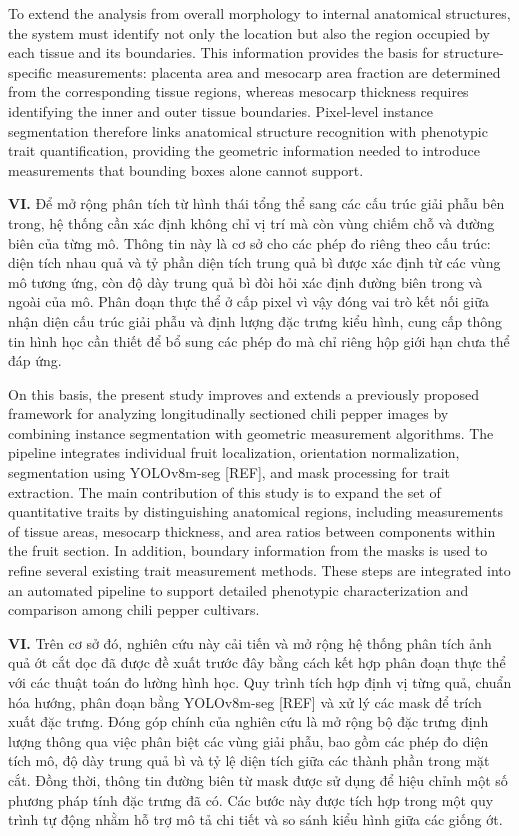 \documentclass[final,1p,11pt,longtitle]{elsarticle}
\newenvironment{viet}{\par\smallskip\begingroup\color{viColor}\noindent\textbf{VI. }\ignorespaces}{\par\endgroup\smallskip}
\begin{document}
To extend the analysis from overall morphology to internal anatomical structures, the system must identify not only the location but also the region occupied by each tissue and its boundaries. This information provides the basis for structure-specific measurements: placenta area and mesocarp area fraction are determined from the corresponding tissue regions, whereas mesocarp thickness requires identifying the inner and outer tissue boundaries. Pixel-level instance segmentation therefore links anatomical structure recognition with phenotypic trait quantification, providing the geometric information needed to introduce measurements that bounding boxes alone cannot support.

\begin{viet}
Để mở rộng phân tích từ hình thái tổng thể sang các cấu trúc giải phẫu bên trong, hệ thống cần xác định không chỉ vị trí mà còn vùng chiếm chỗ và đường biên của từng mô. Thông tin này là cơ sở cho các phép đo riêng theo cấu trúc: diện tích nhau quả và tỷ phần diện tích trung quả bì được xác định từ các vùng mô tương ứng, còn độ dày trung quả bì đòi hỏi xác định đường biên trong và ngoài của mô. Phân đoạn thực thể ở cấp pixel vì vậy đóng vai trò kết nối giữa nhận diện cấu trúc giải phẫu và định lượng đặc trưng kiểu hình, cung cấp thông tin hình học cần thiết để bổ sung các phép đo mà chỉ riêng hộp giới hạn chưa thể đáp ứng.
\end{viet}


On this basis, the present study improves and extends a previously proposed framework for analyzing longitudinally sectioned chili pepper images by combining instance segmentation with geometric measurement algorithms. The pipeline integrates individual fruit localization, orientation normalization, segmentation using YOLOv8m-seg [REF], and mask processing for trait extraction. The main contribution of this study is to expand the set of quantitative traits by distinguishing anatomical regions, including measurements of tissue areas, mesocarp thickness, and area ratios between components within the fruit section. In addition, boundary information from the masks is used to refine several existing trait measurement methods. These steps are integrated into an automated pipeline to support detailed phenotypic characterization and comparison among chili pepper cultivars.

\begin{viet}
Trên cơ sở đó, nghiên cứu này cải tiến và mở rộng hệ thống phân tích ảnh quả ớt cắt dọc đã được đề xuất trước đây bằng cách kết hợp phân đoạn thực thể với các thuật toán đo lường hình học. Quy trình tích hợp định vị từng quả, chuẩn hóa hướng, phân đoạn bằng YOLOv8m-seg [REF] và xử lý các mask để trích xuất đặc trưng. Đóng góp chính của nghiên cứu là mở rộng bộ đặc trưng định lượng thông qua việc phân biệt các vùng giải phẫu, bao gồm các phép đo diện tích mô, độ dày trung quả bì và tỷ lệ diện tích giữa các thành phần trong mặt cắt. Đồng thời, thông tin đường biên từ mask được sử dụng để hiệu chỉnh một số phương pháp tính đặc trưng đã có. Các bước này được tích hợp trong một quy trình tự động nhằm hỗ trợ mô tả chi tiết và so sánh kiểu hình giữa các giống ớt.
\end{viet}
\end{document}
